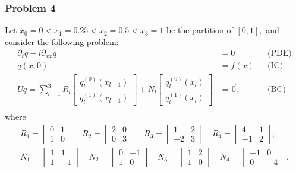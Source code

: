 \documentclass[11pt,reqno,oneside,a4paper]{article}
\theoremstyle{plain} %
\theoremstyle{definition}
\theoremstyle{remark}
\begin{document}
\subsubsection*{Problem 4}
Let $x_0 = 0 < x_1  = 0.25 < x_2 = 0.5 < x_3 = 1$ be the partition of $[0,1],$ and consider the following problem:
\begin{align*}
\partial_t q - i \partial_{xx} q &= 0 &&\text{(PDE)} \\
q(x, 0) &= f(x) &&\text{(IC)} \\
Uq = \sum^3_{l=1} R_l \begin{bmatrix} q_l^{(0)}(x_{l-1}) \\ q_l^{(1)}(x_{l-1}) \end{bmatrix} + N_l \begin{bmatrix} q_l^{(0)}(x_{l}) \\ q_l^{(1)}(x_{l}) \end{bmatrix} &= \vec{0}, &&\text{(BC)} \\
\end{align*}
where 
\begin{equation*}
\begin{aligned}
R_1 = \begin{bmatrix} 0 & 1\\ 1 & 0 \end{bmatrix} \quad R_2= \begin{bmatrix} 2 & 0  \\ 0 & 3 \end{bmatrix} \quad R_3 = \begin{bmatrix} 1 & 2 \\ -2 & 3 \end{bmatrix} \quad R_4 = \begin{bmatrix} 4 & 1 \\ -1 & 2 \end{bmatrix}; \\
N_1 = \begin{bmatrix} 1 & 1 \\ 1 & -1 \end{bmatrix} \quad N_2= \begin{bmatrix} 0 & -1  \\ 1 & 0 \end{bmatrix} \quad N_3 = \begin{bmatrix} 1 & 2 \\ 1 & 0 \end{bmatrix} \quad N_4 = \begin{bmatrix} -1 & 0 \\ 0 & -4 \end{bmatrix}.
\end{aligned}
\end{equation*}
\end{document}
